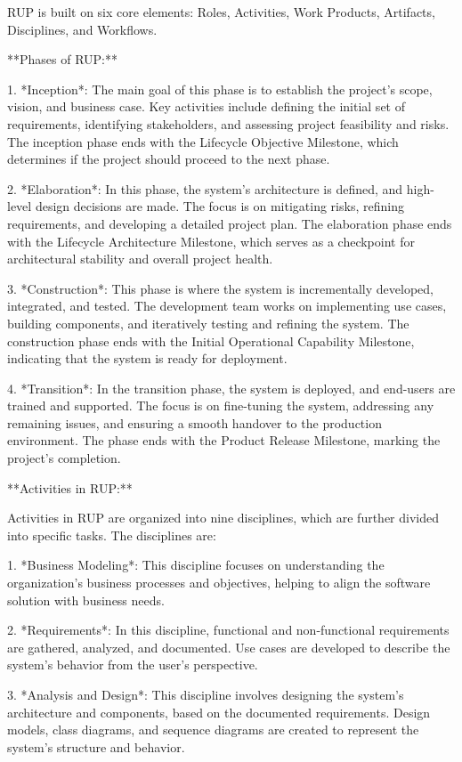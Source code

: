 \documentclass{article}
\begin{document}
RUP is built on six core elements: Roles, Activities, Work Products, Artifacts, Disciplines, and Workflows.

**Phases of RUP:**

1. *Inception*: The main goal of this phase is to establish the project's scope, vision, and business case. Key activities include defining the initial set of requirements, identifying stakeholders, and assessing project feasibility and risks. The inception phase ends with the Lifecycle Objective Milestone, which determines if the project should proceed to the next phase.

2. *Elaboration*: In this phase, the system's architecture is defined, and high-level design decisions are made. The focus is on mitigating risks, refining requirements, and developing a detailed project plan. The elaboration phase ends with the Lifecycle Architecture Milestone, which serves as a checkpoint for architectural stability and overall project health.

3. *Construction*: This phase is where the system is incrementally developed, integrated, and tested. The development team works on implementing use cases, building components, and iteratively testing and refining the system. The construction phase ends with the Initial Operational Capability Milestone, indicating that the system is ready for deployment.

4. *Transition*: In the transition phase, the system is deployed, and end-users are trained and supported. The focus is on fine-tuning the system, addressing any remaining issues, and ensuring a smooth handover to the production environment. The phase ends with the Product Release Milestone, marking the project's completion.

**Activities in RUP:**

Activities in RUP are organized into nine disciplines, which are further divided into specific tasks. The disciplines are:

1. *Business Modeling*: This discipline focuses on understanding the organization's business processes and objectives, helping to align the software solution with business needs.

2. *Requirements*: In this discipline, functional and non-functional requirements are gathered, analyzed, and documented. Use cases are developed to describe the system's behavior from the user's perspective.

3. *Analysis and Design*: This discipline involves designing the system's architecture and components, based on the documented requirements. Design models, class diagrams, and sequence diagrams are created to represent the system's structure and behavior.
\end{document}
